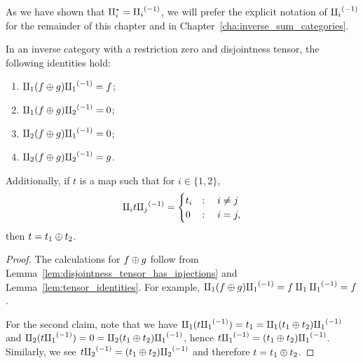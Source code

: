 As we have shown that $\amalg_{i}^{*} = {\amalg_{i}}^{(-1)}$, we will prefer the explicit notation of ${\amalg_{i}}^{(-1)}$ for the
remainder of this chapter and in Chapter~\ref{cha:inverse_sum_categories}.

\begin{corollary}\label{cor:split_plus_tensor}
  In an inverse category \X with a restriction zero and disjointness tensor, the following
  identities hold:
  \begin{multicols}{2}
    \begin{enumerate}[{(}i{)}]
      \item $\amalg_{1} (f \oplus g) {\amalg_{1}}^{(-1)} = f$;
      \item $\amalg_{1} (f\oplus g) {\amalg_{2}}^{(-1)} = 0$;
      \item $\amalg_{2} (f \oplus g) {\amalg_{1}}^{(-1)} = 0$;
      \item $\amalg_{2} (f\oplus g) {\amalg_{2}}^{(-1)} = g$.
    \end{enumerate}
  \end{multicols}
  Additionally, if $t$ is a map such that for $i \in \{1,2\}$,
  \[
    \amalg_{i} t {\amalg_{j}}^{(-1)} =
    \begin{cases}
      t_i& : \quad i \neq j\\
      0 & : \quad i = j,
    \end{cases}
  \]
  then $t = t_1 \oplus t_2$.
\end{corollary}
\begin{proof}
  The calculations for $f\oplus g$ follow from Lemma~\ref{lem:disjointness_tensor_has_injections} and
  Lemma~\ref{lem:tensor_identities}. For example, $\amalg_{1} (f\oplus g) {\amalg_{1}}^{(-1)} = f \amalg_{1} {\amalg_{1}}^{(-1)} = f$.

  For the second claim, note that we have $\amalg_{1} (t {\amalg_{1}}^{(-1)}) = t_1 = \amalg_{1} ( t_1 \oplus t_2){\amalg_{1}}^{(-1)}$ and
  $\amalg_{2}  (t {\amalg_{1}}^{(-1)}) = 0 = \amalg_{2} ( t_1 \oplus t_2){\amalg_{1}}^{(-1)}$, hence $t {\amalg_{1}}^{(-1)} = ( t_1 \oplus t_2){\amalg_{1}}^{(-1)}$. Similarly,
  we see $t{\amalg_{2}}^{(-1)} = ( t_1 \oplus t_2){\amalg_{2}}^{(-1)}$ and therefore $t = t_1 \oplus t_2$.
\end{proof}

